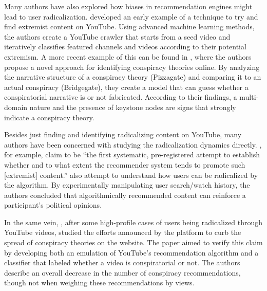 Many authors have also explored how biases in recommendation engines might lead
to user radicalization. \citet{agarwal_topic-specific_2015} developed an early
example of a technique to try and find extremist content on YouTube. Using
advanced machine learning methods, the authors create a YouTube crawler that
starts from a seed video and iteratively classifies featured channels and videos
according to their potential extremism. A more recent example of this can be
found in \citet{tangherlini_automated_2020}, where the authors propose a novel
approach for identifying conspiracy theories online. By analyzing the narrative
structure of a conspiracy theory (Pizzagate) and comparing it to an actual
conspiracy (Bridgegate), they create a model that can guess whether a
conspiratorial narrative is or not fabricated. According to their findings, a
multi-domain nature and the presence of keystone nodes are signs that strongly
indicate a conspiracy theory.

Besides just finding and identifying radicalizing content on YouTube, many
authors have been concerned with studying the radicalization dynamics directly.
\citet{alfano_technologically_2020}, for example, claim to be ``the first
systematic, pre-registered attempt to establish whether and to what extent the
recommender system tends to promote such [extremist] content.''
\citet{cho_search_2020} also attempt to understand how users can be radicalized
by the algorithm. By experimentally manipulating user search/watch history, the
authors concluded that algorithmically recommended content can reinforce a
participant's political opinions.

In the same vein, \citet{faddoul_longitudinal_2020}, after some high-profile
cases of users being radicalized through YouTube videos, studied the efforts
announced by the platform to curb the spread of conspiracy theories on the
website. The paper aimed to verify this claim by developing both an emulation of
YouTube's recommendation algorithm and a classifier that labeled whether a video
is conspiratorial or not. The authors describe an overall decrease in the number
of conspiracy recommendations, though not when weighing these recommendations by
views.

